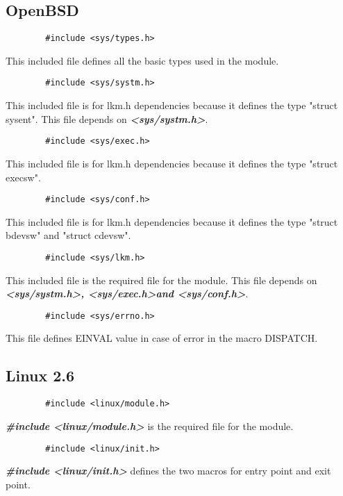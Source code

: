 \documentclass[11pt]{report}
\begin{document}
  \subsection{OpenBSD}

    \begin{lstlisting}
        #include <sys/types.h>
    \end{lstlisting}
	This included file defines all the basic types used in the module.\\

    \begin{lstlisting}
        #include <sys/systm.h>
    \end{lstlisting}
	This included file is for lkm.h dependencies because it defines the type
    "struct sysent". This file depends on {\bf\it\textless sys/systm.h\textgreater}.\\

    \begin{lstlisting}
        #include <sys/exec.h>
    \end{lstlisting}
	This included file is for lkm.h dependencies because it defines the type
    "struct execsw".\\

    \begin{lstlisting}
        #include <sys/conf.h>
    \end{lstlisting}
	This included file is for lkm.h dependencies because it defines the type
    "struct bdevsw" and "struct cdevsw".\\

    \begin{lstlisting}
        #include <sys/lkm.h>
    \end{lstlisting}
	This included file is the required file for the module. This file depends on
    {\bf \it \textless sys/systm.h\textgreater,
    \textless sys/exec.h\textgreater and
    \textless sys/conf.h\textgreater}.\\

    \begin{lstlisting}
        #include <sys/errno.h>
    \end{lstlisting}
	This file defines EINVAL value in case of error in the macro DISPATCH.\\

  \subsection{Linux 2.6}
  	\begin{lstlisting}
        #include <linux/module.h>
    \end{lstlisting}
	{\bf \it \#include \textless linux/module.h\textgreater } is the required file for the module.\\
  	\begin{lstlisting}
        #include <linux/init.h>
    \end{lstlisting}
	{\bf \it \#include \textless linux/init.h\textgreater } defines the two macros for entry point and exit point.
\end{document}

